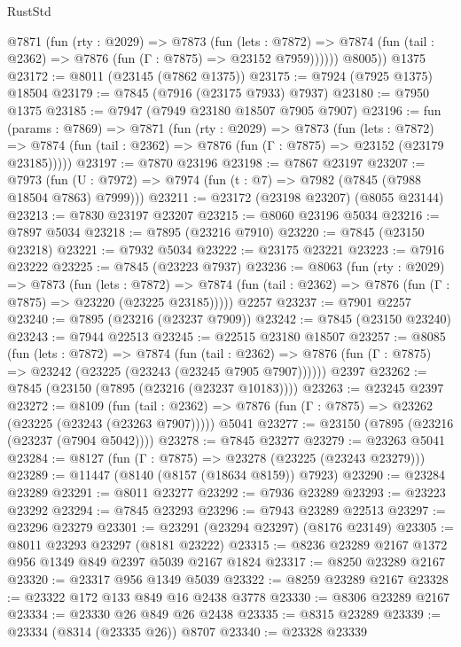 \begin{lexlean}{RustStd}
\begin{coremodule}
          @7871
            (fun (rty : @2029) =>
            @7873
              (fun (lets : @7872) =>
              @7874 (fun (tail : @2362) => @7876 (fun (Γ : @7875) => @23152 @7959))))))
        @8005))
    @1375
@23172 := @8011 (@23145 (@7862 @1375))
@23175 := @7924 (@7925 @1375) @18504
@23179 := @7845 (@7916 (@23175 @7933) @7937)
@23180 := @7950 @1375
@23185 := @7947 (@7949 @23180 @18507 @7905 @7907)
@23196 := fun (params : @7869) =>
  @7871
    (fun (rty : @2029) =>
    @7873
      (fun (lets : @7872) =>
      @7874 (fun (tail : @2362) => @7876 (fun (Γ : @7875) => @23152 (@23179 @23185)))))
@23197 := @7870 @23196
@23198 := @7867 @23197
@23207 := @7973
    (fun (U : @7972) => @7974 (fun (t : @7) => @7982 (@7845 (@7988 @18504 @7863) @7999)))
@23211 := @23172 (@23198 @23207) (@8055 @23144)
@23213 := @7830 @23197 @23207
@23215 := @8060 @23196 @5034
@23216 := @7897 @5034
@23218 := @7895 (@23216 @7910)
@23220 := @7845 (@23150 @23218)
@23221 := @7932 @5034
@23222 := @23175 @23221
@23223 := @7916 @23222
@23225 := @7845 (@23223 @7937)
@23236 := @8063
    (fun (rty : @2029) =>
    @7873
      (fun (lets : @7872) =>
      @7874 (fun (tail : @2362) => @7876 (fun (Γ : @7875) => @23220 (@23225 @23185)))))
    @2257
@23237 := @7901 @2257
@23240 := @7895 (@23216 (@23237 @7909))
@23242 := @7845 (@23150 @23240)
@23243 := @7944 @22513
@23245 := @22515 @23180 @18507
@23257 := @8085
    (fun (lets : @7872) =>
    @7874
      (fun (tail : @2362) =>
      @7876 (fun (Γ : @7875) => @23242 (@23225 (@23243 (@23245 @7905 @7907))))))
    @2397
@23262 := @7845 (@23150 (@7895 (@23216 (@23237 @10183))))
@23263 := @23245 @2397
@23272 := @8109
    (fun (tail : @2362) => @7876 (fun (Γ : @7875) => @23262 (@23225 (@23243 (@23263 @7907)))))
    @5041
@23277 := @23150 (@7895 (@23216 (@23237 (@7904 @5042))))
@23278 := @7845 @23277
@23279 := @23263 @5041
@23284 := @8127 (fun (Γ : @7875) => @23278 (@23225 (@23243 @23279)))
@23289 := @11447 (@8140 (@8157 (@18634 @8159)) @7923)
@23290 := @23284 @23289
@23291 := @8011 @23277
@23292 := @7936 @23289
@23293 := @23223 @23292
@23294 := @7845 @23293
@23296 := @7943 @23289 @22513
@23297 := @23296 @23279
@23301 := @23291 (@23294 @23297) (@8176 @23149)
@23305 := @8011 @23293 @23297 (@8181 @23222)
@23315 := @8236 @23289 @2167 @1372 @956 @1349 @849 @2397 @5039 @2167 @1824
@23317 := @8250 @23289 @2167
@23320 := @23317 @956 @1349 @5039
@23322 := @8259 @23289 @2167
@23328 := @23322 @172 @133 @849 @16 @2438 @3778
@23330 := @8306 @23289 @2167
@23334 := @23330 @26 @849 @26 @2438
@23335 := @8315 @23289
@23339 := @23334 (@8314 (@23335 @26)) @8707
@23340 := @23328 @23339

\end{coremodule}
\end{lexlean}
